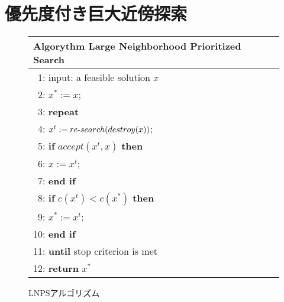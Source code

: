 \section{優先度付き巨大近傍探索}
\begin{figure}[tb]\centering
\begin{tabular}{l}\hline
\textbf{\small Algorythm} \footnotesize{Large Neighborhood Prioritized Search}\\\hline
 ~1: input: a feasible solution $x$ \\
 ~2: $x^{*} :=  x$; \\
 ~3: \bf{repeat} \\
 ~4: \quad \quad $x^{t} := re\mathchar`-search(destroy(x))$; \\
 ~5: \quad \quad \textbf{if} $accept(x^{t}, x)$ \textbf{then} \\
 ~6: \quad \quad \quad \quad $x := x^{t}$; \\
 ~7: \quad \quad \textbf{end if} \\
 ~8: \quad \quad \textbf{if} $c(x^{t}) < c(x^{*})$ \textbf{then} \\
 ~9: \quad \quad \quad \quad $x^{*} := x^{t}$; \\
10: \quad \quad \textbf{end if} \\
11: \textbf{until} stop criterion is met \\
12: \textbf{return} $x^{*}$ \\ \hline
\end{tabular}
\caption{LNPSアルゴリズム}
\label{algo:lnps}
\end{figure}


